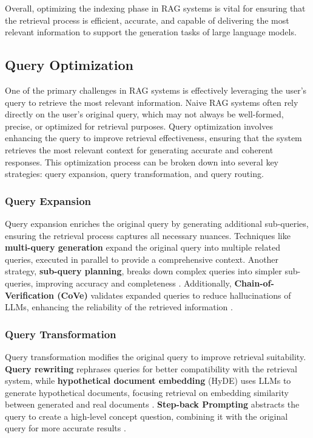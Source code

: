 Overall, optimizing the indexing phase in RAG systems is vital for ensuring that the retrieval process is efficient, accurate, and capable of delivering the most relevant information to support the generation tasks of large language models.

\subsection{Query Optimization}

One of the primary challenges in RAG systems is effectively leveraging the user's query to retrieve the most relevant information. Naive RAG systems often rely directly on the user’s original query, which may not always be well-formed, precise, or optimized for retrieval purposes. Query optimization involves enhancing the query to improve retrieval effectiveness, ensuring that the system retrieves the most relevant context for generating accurate and coherent responses. This optimization process can be broken down into several key strategies: query expansion, query transformation, and query routing.

\subsubsection{Query Expansion}

Query expansion enriches the original query by generating additional sub-queries, ensuring the retrieval process captures all necessary nuances. Techniques like \textbf{multi-query generation} expand the original query into multiple related queries, executed in parallel to provide a comprehensive context. Another strategy, \textbf{sub-query planning}, breaks down complex queries into simpler sub-queries, improving accuracy and completeness \cite{zhou2022least}. Additionally, \textbf{Chain-of-Verification (CoVe)} validates expanded queries to reduce hallucinations of LLMs, enhancing the reliability of the retrieved information \cite{dhuliawala2023chain}.

\subsubsection{Query Transformation}

Query transformation modifies the original query to improve retrieval suitability. \textbf{Query rewriting} rephrases queries for better compatibility with the retrieval system, while \textbf{hypothetical document embedding} (HyDE) uses LLMs to generate hypothetical documents, focusing retrieval on embedding similarity between generated and real documents \cite{gao2022precise}. \textbf{Step-back Prompting} abstracts the query to create a high-level concept question, combining it with the original query for more accurate results \cite{zheng2023take}.

